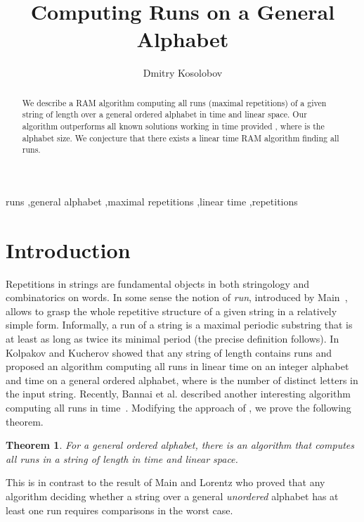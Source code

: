 \documentclass[3p,twocolumn]{elsarticle}
\theoremstyle{plain}
\newtheorem*{theorem}{Theorem}
\theoremstyle{definition}
\begin{document}
\begin{frontmatter}

\title{Computing Runs on a General Alphabet}

\author{Dmitry Kosolobov} \address{Ural Federal University, Ekaterinburg, Russia}

\begin{abstract}
We describe a RAM algorithm computing all runs (maximal repetitions) of a given string of length  over a general ordered alphabet in  time and linear space. Our algorithm outperforms all known solutions working in  time provided , where  is the alphabet size. We conjecture that there exists a linear time RAM algorithm finding all runs.
\end{abstract}


\begin{keyword}
runs \sep general alphabet \sep maximal repetitions \sep linear time \sep  repetitions
\end{keyword}

\end{frontmatter}


\section{Introduction}

Repetitions in strings are fundamental objects in both stringology and combinatorics on words. In some sense the notion of \emph{run}, introduced by Main~\cite{Main}, allows to grasp the whole repetitive structure of a given string in a relatively simple form. Informally, a run of a string is a maximal periodic substring that is at least as long as twice its minimal period (the precise definition follows). In~\cite{KolpakovKucherov} Kolpakov and Kucherov showed that any string of length  contains  runs and proposed an algorithm computing all runs in linear time on an integer alphabet  and  time on a general ordered alphabet, where  is the number of distinct letters in the input string. Recently, Bannai et al. described another interesting algorithm computing all runs in  time~\cite{BannaiIInenagaNakashimaTakedaTsuruta}. Modifying the approach of \cite{BannaiIInenagaNakashimaTakedaTsuruta}, we prove the following theorem.
\begin{theorem}
For a general ordered alphabet, there is an algorithm that computes all runs in a string of length  in  time and linear space.
\end{theorem}
This is in contrast to the result of Main and Lorentz \cite{MainLorentz} who proved that any algorithm deciding whether a string over a general \emph{unordered} alphabet has at least one run requires  comparisons in the worst case.
\end{document}
